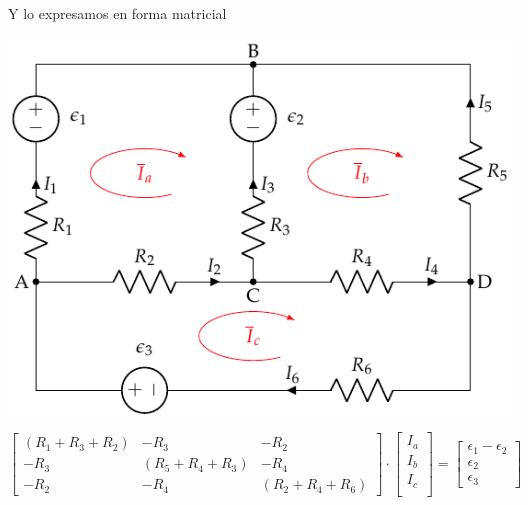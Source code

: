 \documentclass[xcolor={usenames,svgnames,dvipsnames}]{beamer}
\begin{document}
\begin{frame}[label={sec:orge24401c}]{Y lo expresamos en forma matricial}
\begin{center}
\includegraphics[height=0.5\textheight]{figs/mallas1_corrientes.pdf}
\end{center}

\begin{equation*}
  \begin{bmatrix}
    (R_1 + R_3 + R_2) &  - R_3 & - R_2 \\
    - R_3 & (R_5 + R_4 + R_3) & - R_4 \\
    - R_2 & - R_4 &  (R_2 + R_4 + R_6)
  \end{bmatrix} \cdot %
  \begin{bmatrix}
    I_a\\
    I_b\\
    I_c\\
  \end{bmatrix} = %
  \begin{bmatrix}
    \epsilon_1 - \epsilon_2\\
    \epsilon_2\\
    \epsilon_3
  \end{bmatrix}
\end{equation*}
\end{frame}
\end{document}
